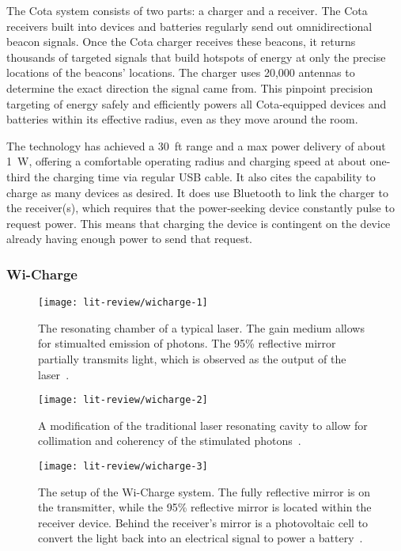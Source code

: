 The Cota system consists of two parts: a charger and a receiver. The Cota receivers built into devices and batteries regularly send out omnidirectional beacon signals. Once the Cota charger receives these beacons, it returns thousands of targeted signals that build hotspots of energy at only the precise locations of the beacons' locations. The charger uses 20,000 antennas to determine the exact direction the signal came from. This pinpoint precision targeting of energy safely and efficiently powers all Cota-equipped devices and batteries within its effective radius, even as they move around the room.

The technology has achieved a 30~ft range and a max power delivery of about 1~W, offering a comfortable operating radius and charging speed at about one-third the charging time via regular USB cable. It also cites the capability to charge as many devices as desired. It does use Bluetooth to link the charger to the receiver(s), which requires that the power-seeking device constantly pulse to request power. This means that charging the device is contingent on the device already having enough power to send that request.

\subsubsection{Wi-Charge}

\begin{figure}
\centering
\texttt{[image: lit-review/wicharge-1]}
    \caption[Wi-Charge: Typical laser]{The resonating chamber of a typical laser. The gain medium allows for stimualted emission of photons. The 95\% reflective mirror partially transmits light, which is observed as the output of the laser~\cite{wicharge2016}.}
    \label{fig:lit-review-wicharge-1}

\vspace*{\floatsep}%

\texttt{[image: lit-review/wicharge-2]}
    \caption[Wi-Charge: Modified resonating cavity]{A modification of the traditional laser resonating cavity to allow for collimation and coherency of the stimulated photons~\cite{wicharge2016}.}
    \label{fig:lit-review-wicharge-2}

\vspace*{\floatsep}%

\texttt{[image: lit-review/wicharge-3]}
    \caption[Wi-Charge: Wi-Charge setup]{The setup of the Wi-Charge system. The fully reflective mirror is on the transmitter, while the 95\% reflective mirror is located within the receiver device. Behind the receiver's mirror is a photovoltaic cell to convert the light back into an electrical signal to power a battery~\cite{wicharge2016}.}
    \label{fig:lit-review-wicharge-3}
\end{figure}

